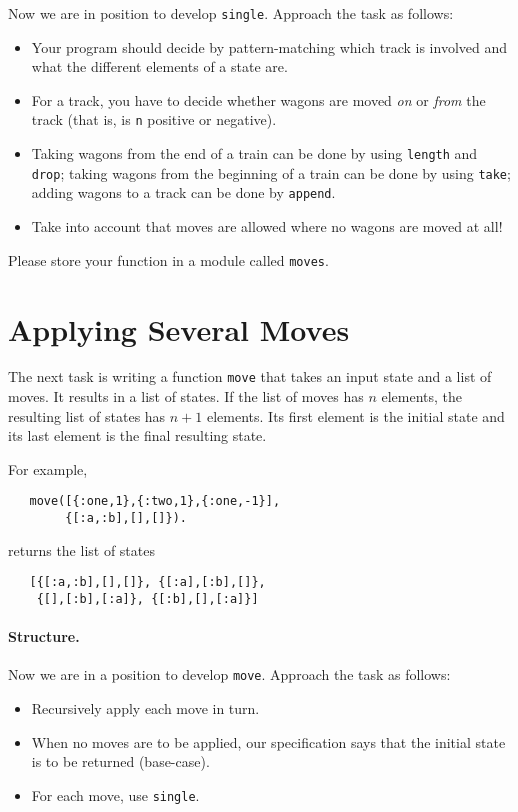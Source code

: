 \documentclass[a4paper,11pt]{article}
\begin{document}
Now we are in position to develop \verb+single+. Approach the
task as follows:
\begin{itemize}
  
\item Your program should decide by pattern-matching which track
  is involved and what the different elements of a state are.
  
\item For a track, you have to decide whether wagons are moved
  \emph{on} or \emph{from} the track (that is, is \verb+n+  positive
  or negative).
  
\item Taking wagons from the end of a train can be done by using
  \verb+length+ and \verb+drop+; taking wagons from the beginning of a
  train can be done by using \verb+take+; adding wagons to a track
  can be done by \verb+append+.

\item Take into account that moves are allowed where no wagons
  are moved at all!
\end{itemize}

Please store your function in a module called \verb+moves+.

\section{Applying Several Moves}

The next task is writing a function \verb+move+ that takes an
input state and a list of moves. It results in a list of
states. If the list of moves has $n$ elements, the resulting list
of states has $n+1$ elements. Its first element is the initial
state and its last element is the final resulting state.

For example,
\begin{verbatim}
   move([{:one,1},{:two,1},{:one,-1}],
        {[:a,:b],[],[]}).
\end{verbatim}
returns the list of states
\begin{verbatim}
   [{[:a,:b],[],[]}, {[:a],[:b],[]}, 
    {[],[:b],[:a]}, {[:b],[],[:a]}]
\end{verbatim}


\paragraph{Structure.}

Now we are in a position to develop \verb+move+. Approach the
task as follows:
\begin{itemize}

\item Recursively apply each move in turn.
  
\item When no moves are to be applied, our specification says
  that the initial state is to be returned (base-case).
  
\item For each move, use \verb+single+.
\end{itemize}
\end{document}
